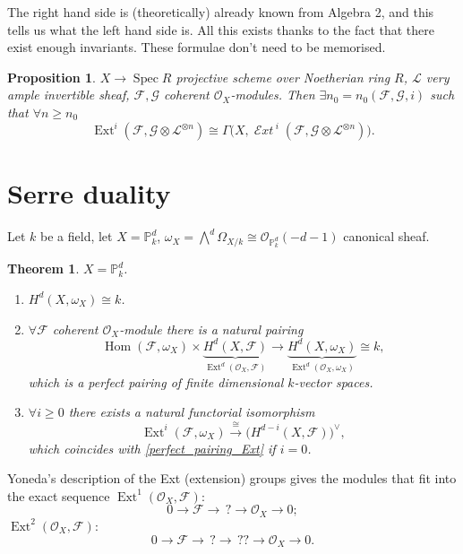 \documentclass[12pt]{article}
\DeclareMathOperator{\Hom}{Hom}
\DeclareMathOperator{\Spec}{Spec}
\DeclareMathOperator{\Ext}{Ext}
\DeclareMathOperator{\shExt}{\mathcal E\textit{xt}\,}
\newtheorem*{proposition}{Proposition}
\newtheorem*{theorem}{Theorem}
\theoremstyle{definition}
\begin{document}
The right hand side is (theoretically) already known from Algebra 2, and this tells us what the left hand side is. All this exists thanks to the fact that there exist enough invariants. These formulae don't need to be memorised.

\begin{proposition}
$X\rightarrow\Spec R$ projective scheme over Noetherian ring $R$, $\mathcal L$ very ample invertible sheaf, $\mathcal F,\mathcal G$ coherent $\mathcal O_X$-modules. Then $\exists n_0=n_0(\mathcal F,\mathcal G,i)$ such that $\forall n\geq n_0$
\[\Ext^i(\mathcal F,\mathcal G\otimes\mathcal L^{\otimes n})\cong\Gamma\big(X,\shExt^i(\mathcal F,\mathcal G\otimes\mathcal L^{\otimes n})\big).\]
\end{proposition}

\section{Serre duality}
Let $k$ be a field, let $X=\mathbb P_k^d$, $\omega_X=\bigwedge^d\Omega_{X/k}\cong\mathcal O_{\mathbb P_k^d}(-d-1)$ canonical sheaf.

\begin{theorem}
$X=\mathbb P_k^d$.

\begin{enumerate}[label=\arabic*)]
\item $H^d(X,\omega_X)\cong k$.

\item\label{perfect_pairing_Ext} $\forall\mathcal F$ coherent $\mathcal O_X$-module there is a natural pairing
\[\Hom(\mathcal F,\omega_X)\times\underbrace{H^d(X,\mathcal F)}_{\Ext^d(\mathcal O_X,\mathcal F)}\longrightarrow\underbrace{H^d(X,\omega_X)}_{\Ext^d(\mathcal O_X,\omega_X)}\cong k,\]
which is a perfect pairing of finite dimensional $k$-vector spaces.

\item $\forall i\geq0$ there exists a natural functorial isomorphism
\[\Ext^i(\mathcal F,\omega_X)\overset\cong\longrightarrow\big(H^{d-i}(X,\mathcal F)\big)^\vee,\]
which coincides with \ref{perfect_pairing_Ext} if $i=0$.
\end{enumerate}
\end{theorem}

Yoneda's description of the Ext (extension) groups gives the modules that fit into the exact sequence $\Ext^1(\mathcal O_X,\mathcal F)$:
\[0\longrightarrow\mathcal F\longrightarrow\,?\longrightarrow\mathcal O_X\longrightarrow0;\]
$\Ext^2(\mathcal O_X,\mathcal F)$:
\[0\longrightarrow\mathcal F\longrightarrow\,?\longrightarrow\,??\longrightarrow\mathcal O_X\longrightarrow0.\]
\end{document}
